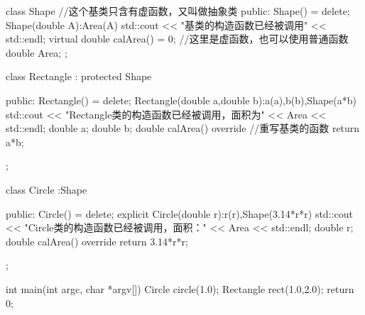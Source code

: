 \begin{tcode}
class Shape {//这个基类只含有虚函数，又叫做抽象类
public:
    Shape() = delete;
    Shape(double A):Area(A)
    {std::cout << "基类的构造函数已经被调用" << std::endl;}
    virtual double calArea() = 0; //这里是虚函数，也可以使用普通函数
    double Area;
};

class Rectangle
        : protected Shape{
public:
    Rectangle() = delete;
    Rectangle(double a,double b):a(a),b(b),Shape(a*b)
    {std::cout << "Rectangle类的构造函数已经被调用，面积为" << Area << std::endl;}
    double a;
    double b;
    double calArea() override{  //重写基类的函数
        return a*b;
    }

};

class Circle
        :Shape{
public:
    Circle() = delete;
    explicit Circle(double r):r(r),Shape(3.14*r*r)
    {std::cout << "Circle类的构造函数已经被调用，面积：" << Area << std::endl;}
    double r;
    double calArea() override{
        return 3.14*r*r;
    }

};

int main(int argc, char *argv[]) {
    Circle circle(1.0);
    Rectangle rect(1.0,2.0);
    return 0;
}
\end{tcode}


 